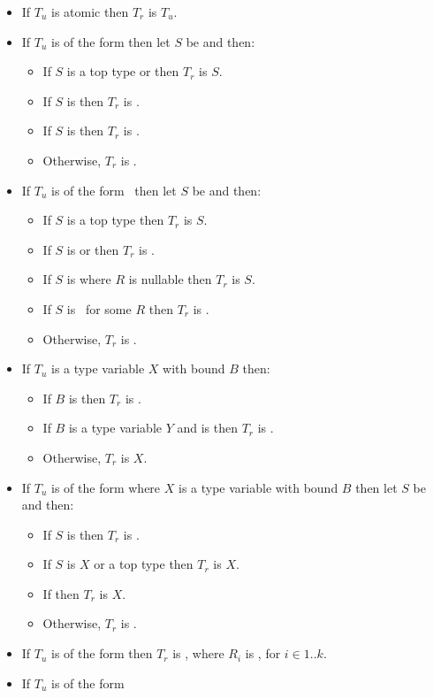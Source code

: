 \documentclass[makeidx]{article}
\begin{document}
\begin{itemize}
\item
  If $T_u$ is atomic then $T_r$ is $T_u$.
\item If $T_u$ is of the form 
  then let $S$ be  and then:
  \begin{itemize}
  \item If $S$ is a top type or  then $T_r$ is $S$.
  \item If $S$ is  then $T_r$ is .
  \item If $S$ is  then $T_r$ is .
  \item Otherwise, $T_r$ is .
  \end{itemize}
\item If $T_u$ is of the form \ then
  let $S$ be  and then:
  \begin{itemize}
  \item If $S$ is a top type then $T_r$ is $S$.
  \item If $S$ is  or  then
    $T_r$ is .
  \item If $S$ is  where $R$ is nullable then
    $T_r$ is $S$.
  \item If $S$ is \ for some $R$ then $T_r$ is .
  \item Otherwise, $T_r$ is .
  \end{itemize}
\item If $T_u$ is a type variable $X$ with bound $B$ then:
  \begin{itemize}
  \item If $B$ is  then $T_r$ is .
  \item If $B$ is a type variable $Y$
    and  is 
    then $T_r$ is .
  \item Otherwise, $T_r$ is $X$.
  \end{itemize}
\item If $T_u$ is of the form 
  where $X$ is a type variable with bound $B$
  then let $S$ be  and then:
  \begin{itemize}
  \item If $S$ is  then $T_r$ is .
  \item If $S$ is $X$ or a top type then $T_r$ is $X$.
  \item If  then $T_r$ is $X$.
  \item Otherwise, $T_r$ is .
  \end{itemize}
\item If $T_u$ is of the form 
  then $T_r$ is ,
  where $R_i$ is , for $i \in 1 .. k$.
\item If $T_u$ is of the form


\end{itemize}
\end{document}
